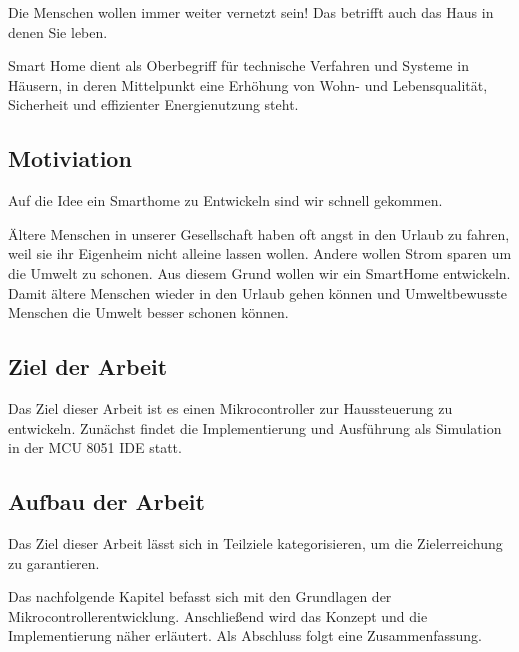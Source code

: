 Die Menschen wollen immer weiter vernetzt sein! Das betrifft auch das Haus in denen Sie leben. \vspace{5pt}

Smart Home dient als Oberbegriff für technische Verfahren und Systeme in Häusern, in deren Mittelpunkt eine Erhöhung von Wohn- und Lebensqualität, Sicherheit und effizienter Energienutzung steht.

\subsection{Motiviation}
	Auf die Idee ein Smarthome zu Entwickeln sind wir schnell gekommen. 
	
	Ältere Menschen in unserer Gesellschaft haben oft angst in den Urlaub zu fahren, weil sie ihr Eigenheim nicht alleine lassen wollen. Andere wollen Strom sparen um die Umwelt zu schonen. Aus diesem Grund wollen wir ein SmartHome entwickeln. Damit ältere Menschen wieder in den Urlaub gehen können und Umweltbewusste Menschen die Umwelt besser schonen können.

\subsection{Ziel der Arbeit}
	Das Ziel dieser Arbeit ist es einen Mikrocontroller zur Haussteuerung zu entwickeln. Zunächst findet die Implementierung und Ausführung als Simulation in der MCU 8051 IDE statt.

\subsection{Aufbau der Arbeit}
	Das Ziel dieser Arbeit lässt sich in Teilziele kategorisieren, um die Zielerreichung zu garantieren.
	
	Das nachfolgende Kapitel befasst sich mit den Grundlagen der Mikrocontrollerentwicklung. Anschließend wird das Konzept und die Implementierung näher erläutert. Als Abschluss folgt eine Zusammenfassung.
